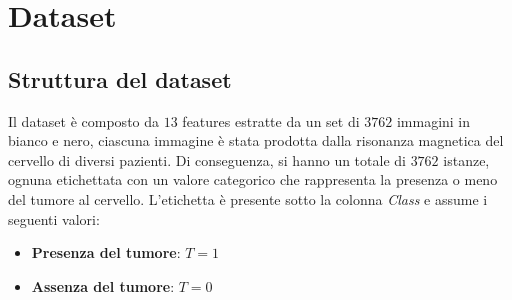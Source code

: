 \chapter{Dataset}
\section{Struttura del dataset}
Il dataset è composto da $13$ features estratte da un set di $3762$ immagini in bianco e nero, 
ciascuna immagine è stata prodotta dalla risonanza magnetica del cervello di diversi pazienti. 
Di conseguenza, si hanno un totale di $3762$ istanze, ognuna etichettata con un 
valore categorico che rappresenta la presenza o meno del tumore al cervello.
L'etichetta è presente sotto la colonna \textit{Class} e assume i seguenti valori:
\begin{itemize}
      \item \textbf{Presenza del tumore}: $T = 1$
      \item \textbf{Assenza del tumore}: $T = 0$
\end{itemize}

